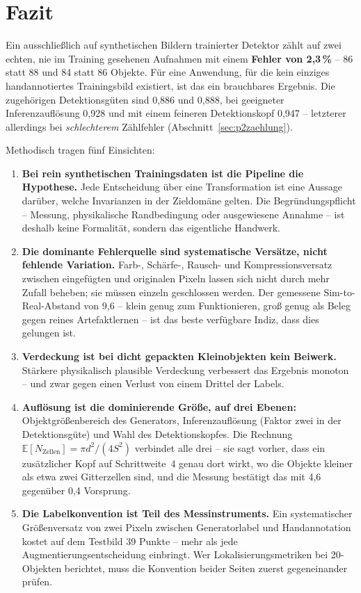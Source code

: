 \section{Fazit}

Ein ausschließlich auf synthetischen Bildern trainierter Detektor zählt auf zwei
echten, nie im Training gesehenen Aufnahmen mit einem \textbf{Fehler von
2,3\,\%} -- 86 statt 88 und 84 statt 86 Objekte. Für eine Anwendung, für die kein
einziges handannotiertes Trainingsbild existiert, ist das ein brauchbares
Ergebnis. Die zugehörigen Detektionsgüten sind \mAPfifty{} 0,886 und 0,888, bei
geeigneter Inferenzauflösung 0,928 und mit einem feineren Detektionskopf 0,947 --
letzterer allerdings bei \emph{schlechterem} Zählfehler
(Abschnitt~\ref{sec:p2zaehlung}).

Methodisch tragen fünf Einsichten:

\begin{enumerate}[itemsep=2pt]
  \item \textbf{Bei rein synthetischen Trainingsdaten ist die Pipeline die
  Hypothese.} Jede Entscheidung über eine Transformation ist eine Aussage
  darüber, welche Invarianzen in der Zieldomäne gelten. Die Begründungspflicht --
  Messung, physikalische Randbedingung oder ausgewiesene Annahme -- ist deshalb
  keine Formalität, sondern das eigentliche Handwerk.
  \item \textbf{Die dominante Fehlerquelle sind systematische Versätze, nicht
  fehlende Variation.} Farb-, Schärfe-, Rausch- und Kompressionsversatz zwischen
  eingefügten und originalen Pixeln lassen sich nicht durch mehr Zufall beheben;
  sie müssen einzeln geschlossen werden. Der gemessene Sim-to-Real-Abstand von
  9,6\PP{} -- klein genug zum Funktionieren, groß genug als Beleg gegen reines
  Artefaktlernen -- ist das beste verfügbare Indiz, dass dies gelungen ist.
  \item \textbf{Verdeckung ist bei dicht gepackten Kleinobjekten kein Beiwerk.}
  Stärkere physikalisch plausible Verdeckung verbessert das Ergebnis monoton --
  und zwar gegen einen Verlust von einem Drittel der Labels.
  \item \textbf{Auflösung ist die dominierende Größe, auf drei Ebenen:}
  Objektgrößenbereich des Generators, Inferenzauflösung (Faktor zwei in der
  Detektionsgüte) und Wahl des Detektionskopfes. Die Rechnung
  $\mathbb{E}[N_{\text{Zellen}}] = \pi d^2/(4S^2)$ verbindet alle drei -- sie sagt
  vorher, dass ein zusätzlicher Kopf auf Schrittweite~4 genau dort wirkt, wo die
  Objekte kleiner als etwa zwei Gitterzellen sind, und die Messung bestätigt das
  mit 4,6 gegenüber 0,4\PP{} Vorsprung.
  \item \textbf{Die Labelkonvention ist Teil des Messinstruments.} Ein
  systematischer Größenversatz von zwei Pixeln zwischen Generatorlabel und
  Handannotation kostet auf dem Testbild 39 Punkte \mAPseven{} -- mehr als jede
  Augmentierungsentscheidung einbringt. Wer Lokalisierungsmetriken bei
  20\px-Objekten berichtet, muss die Konvention beider Seiten zuerst
  gegeneinander prüfen.
\end{enumerate}
